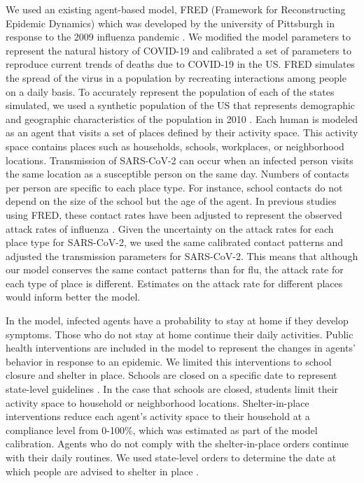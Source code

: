 \documentclass[11pt]{article}
\begin{document}
We used an existing agent-based model, FRED (Framework for Reconstructing Epidemic Dynamics) which was developed by the university of Pittsburgh in response to the 2009 influenza pandemic \cite{grefenstette2013}. We modified the model parameters to represent the natural history of COVID-19 and calibrated a set of parameters to reproduce current trends of deaths due to COVID-19 in the US. FRED simulates the spread of the virus in a population by recreating interactions among people on a daily basis. To accurately represent the population of each of the states simulated, we used a synthetic population of the US that represents demographic and geographic characteristics of the population in 2010 \cite{Wheaton2012}. Each human is modeled as an agent that visits a set of places defined by their activity space. This activity space contains places such as households, schools, workplaces, or neighborhood locations. Transmission of SARS-CoV-2 can occur when an infected person visits the same location as a susceptible person on the same day. Numbers of contacts per person are specific to each place type. For instance, school contacts do not depend on the size of the school but the age of the agent. In previous studies using FRED, these contact rates have been  adjusted to represent the observed attack rates of influenza \cite{grefenstette2013, Mossong2008_PLOS_Medicine}. Given the uncertainty on the attack rates for each place type for SARS-CoV-2, we used the same calibrated contact patterns and adjusted the transmission parameters for SARS-CoV-2. This means that although our model conserves the same contact patterns than for flu, the attack rate for each type of place is different. Estimates on the attack rate for different places would inform better the model.

In the model, infected agents have a probability to stay at home if they develop symptoms. Those who do not stay at home continue their daily activities. Public health interventions are included in the model to represent the changes in agents’ behavior in response to an epidemic. We limited this interventions to school closure and shelter in place. Schools are closed on a specific date to represent state-level guidelines \cite{ihme_covid19_forecasting}. In the case that schools are closed, students limit their activity space to household or neighborhood locations. Shelter-in-place interventions reduce each agent’s activity space to their household at a compliance level from 0-100\%, which was estimated as part of the model calibration. Agents who do not comply with the shelter-in-place orders continue with their daily routines. We used state-level orders to determine the date at which people are advised to shelter in place \cite{ihme_covid19_forecasting}. 
\end{document}
